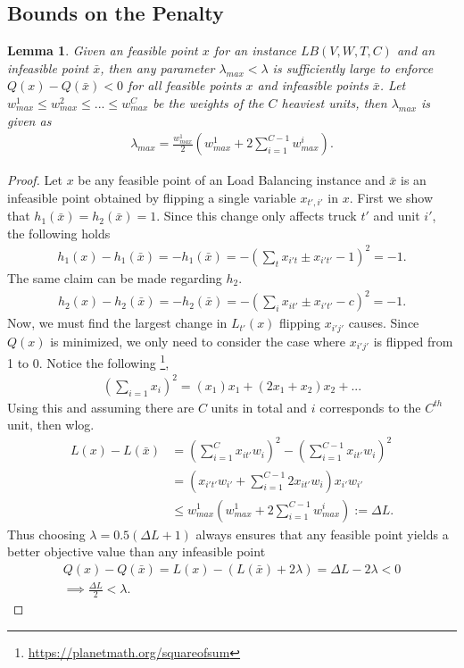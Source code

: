 \documentclass[12pt]{article}
\newtheorem{lemma}[theorem]{Lemma}
\begin{document}
\subsection{Bounds on the Penalty}
\noindent
\begin{lemma} \label{LMA-LB-MAX}
Given an feasible point $x$ for an instance $LB(V, W, T, C)$ and an infeasible point $\bar{x}$, then any parameter $\lambda_{max}<\lambda$ is sufficiently large to enforce $Q(x) - Q(\bar{x}) < 0$ for all feasible points $x$ and infeasible points $\bar{x}$. 
Let $w^1_{max} \leq w^2_{max} \leq ... \leq w^C_{max}$ be the weights of the $C$ heaviest units, then $\lambda_{max}$ is given as
\begin{gather*}
\lambda_{max} = \frac{w^1_{max}}{2}\left(w^1_{max} + 2\sum_{i=1}^{C-1}w^i_{max}\right).
\end{gather*}
\end{lemma}
\begin{proof}
Let $x$ be any feasible point of an Load Balancing instance and $\bar{x}$ is an infeasible point obtained by flipping a single variable $x_{t', i'}$ in $x$.
First we show that $h_1(\bar{x}) = h_2(\bar{x}) = 1$.
Since this change only affects truck $t'$ and unit $i'$, the following holds
\begin{gather*}
h_1(x) - h_1(\bar{x}) = - h_1(\bar{x}) = -\left( \sum_t x_{i't}  \pm x_{i't'} -1 \right)^2 = -1.
\end{gather*}
The same claim can be made regarding $h_2$.
\begin{gather*}
h_2(x) - h_2(\bar{x}) = - h_2(\bar{x}) = -\left( \sum_i x_{it'}  \pm x_{i't'} -c  \right)^2 = -1.
\end{gather*}
Now, we must find the largest change in $L_{t'}(x)$ flipping $x_{i'j'}$ causes.
Since $Q(x)$ is minimized, we only need to consider the case where $x_{i'j'}$ is flipped from 1 to 0.
Notice the following \footnote{\url{https://planetmath.org/squareofsum}},
\begin{gather*}
\left(\sum_{i=1} x_i \right)^2 = (x_1)x_1 + (2x_1 + x_2)x_2 + ...
\end{gather*}
Using this and assuming there are $C$ units in total and $i$ corresponds to the $C^{th}$ unit, then wlog.
\begin{align*}
L(x) - L(\bar{x}) &=  \left( \sum_{i=1}^{C} x_{it'} w_i \right)^2 -  \left( \sum_{i=1}^{C-1} x_{it'} w_i \right)^2 \\
& = \left(x_{i't'} w_{i'} + \sum_{i=1}^{C-1} 2x_{it'} w_i \right)x_{i'}w_{i'} \\ &\leq w^1_{max}\left(w^1_{max} + 2\sum_{i=1}^{C-1}w^i_{max}\right)  := \Delta L.
\end{align*}
Thus choosing $\lambda = 0.5(\Delta L + 1)$ always ensures that any feasible point yields a better objective value than any infeasible point
\begin{gather}
Q(x) -  Q(\bar{x}) = L(x) - (L(\bar{x}) + 2\lambda) = \Delta L - 2\lambda < 0 \\
\implies \frac{\Delta L}{2} < \lambda.
\end{gather}
\end{proof}
\end{document}
